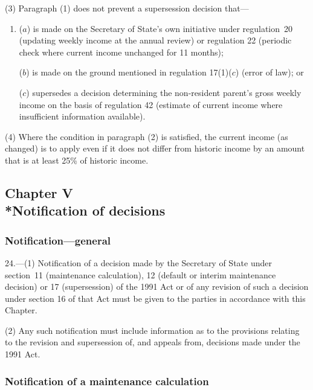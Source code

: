 \documentclass[12pt,a4paper]{article}
\begin{document}
(3) Paragraph (1) does not prevent a supersession decision that—
\begin{enumerate}\item[]
($a$) is made on the Secretary of State’s own initiative under regulation~20 (updating weekly income at the annual review) or regulation 22 (periodic check where current income unchanged for 11 months);

($b$) is made on the ground mentioned in regulation 17(1)($c$)  (error of law); or

($c$) supersedes a decision determining the non-resident parent’s gross weekly income on the basis of regulation 42 (estimate of current income where insufficient information available).
\end{enumerate}

(4) Where the condition in paragraph (2) is satisfied, the current income (as changed) is to apply even if it does not differ from historic income by an amount that is at least 25\% of historic income.

\subsection[Chapter V --- Notification of decisions]{Chapter V\\*Notification of decisions}

\renewcommand\parthead{--- Part III Chapter V}

\subsubsection[24. Notification---general]{Notification---general}

24.---(1)  Notification of a decision made by the Secretary of State under section~11 (maintenance calculation), 12 (default or interim maintenance decision) or 17 (supersession) of the 1991 Act or of any revision of such a decision under section 16 of that Act must be given to the parties in accordance with this Chapter.

(2) Any such notification must include information as to the provisions relating to the revision and supersession of, and appeals from, decisions made under the 1991 Act.

\subsubsection[25. Notification of a maintenance calculation]{Notification of a maintenance calculation}
\end{document}
